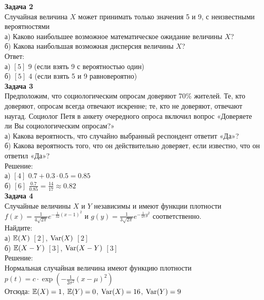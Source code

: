 \documentclass[12pt, a4paper]{article}\usepackage[]{graphicx}\usepackage[]{color}
\begin{document}
	\textbf{Задача 2} \\ %
	Случайная величина $X$ может принимать только значения 5 и 9, с неизвестными вероятностями \\
	а) Каково наибольшее возможное математическое ожидание величины $X$? \\
	б) Какова наибольшая возможная дисперсия величины $X$? \\
	Ответ: \\
	а) $[5]$ 9 (если взять 9 с вероятностью один) \\
	б) $[5]$ 4 (если взять 5 и 9 равновероятно) \\






	\textbf{Задача 3} \\ %
	Предположим, что социологическим опросам доверяют 70\% жителей. Те, кто доверяют, опросам всегда отвечают искренне; те, кто не доверяют, отвечают наугад. Социолог Петя  в анкету очередного опроса включил вопрос «Доверяете ли Вы социологическим опросам?» \\
	а) Какова вероятность, что случайно выбранный респондент ответит «Да»? \\
	б) Какова вероятность того, что он действительно доверяет, если известно, что он ответил «Да»? \\
	Решение: \\
	а) $[4]$ $0.7+0.3\cdot0.5=0.85$ \\
	б) $[6]$ $\frac{0.7}{0.85}=\frac{14}{17}\approx 0.82$ \\


	\textbf{Задача 4} \\
	Случайные величины $X$ и $Y$ независимы и имеют функции плотности $f(x)=\frac{1}{4\sqrt{2\pi } } e^{-\frac{1}{32} (x-1)^{2} }$ и $g(y)=\frac{1}{3\sqrt{2\pi } } e^{-\frac{1}{18} y^{2} }$ соответственно. \\
	Найдите: \\
	а) $\mathbb{E}(X)$ $[2]$, $\operatorname{Var}(X)$ $[2]$ \\
	б) $\mathbb{E}(X-Y)$ $[3]$, $\operatorname{Var}(X-Y)$ $[3]$ \\
	Решение: \\
	Нормальная случайная величина имеют функцию плотности $p(t)=c\cdot \exp(-\frac{1}{2\sigma^{2}}(x-\mu)^{2})$ \\
	Отсюда: $\mathbb{E}(X)=1$, $\mathbb{E}(Y)=0$, $\operatorname{Var}(X)=16$, $\operatorname{Var}(Y)=9$ \\
\end{document}
